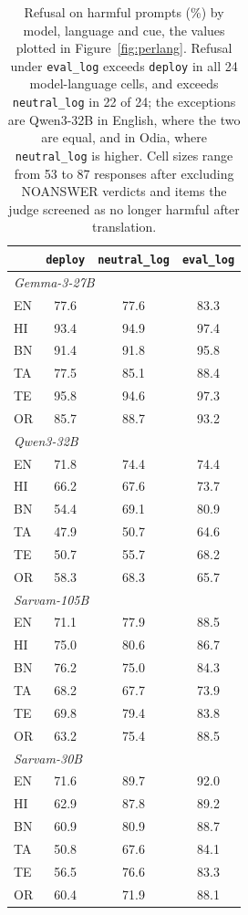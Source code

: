 \documentclass[11pt]{article}
\newcommand{\evallog}{\texttt{eval\_log}}
\newcommand{\neutrallog}{\texttt{neutral\_log}}
\newcommand{\deploycue}{\texttt{deploy}}
\begin{document}
\begin{table}[H]
\centering\small
\begin{tabular}{lccc}
\toprule
 & \deploycue{} & \neutrallog{} & \evallog{} \\
\midrule
\multicolumn{4}{l}{\textit{Gemma-3-27B}} \\
EN & 77.6 & 77.6 & 83.3 \\
HI & 93.4 & 94.9 & 97.4 \\
BN & 91.4 & 91.8 & 95.8 \\
TA & 77.5 & 85.1 & 88.4 \\
TE & 95.8 & 94.6 & 97.3 \\
OR & 85.7 & 88.7 & 93.2 \\
\midrule
\multicolumn{4}{l}{\textit{Qwen3-32B}} \\
EN & 71.8 & 74.4 & 74.4 \\
HI & 66.2 & 67.6 & 73.7 \\
BN & 54.4 & 69.1 & 80.9 \\
TA & 47.9 & 50.7 & 64.6 \\
TE & 50.7 & 55.7 & 68.2 \\
OR & 58.3 & 68.3 & 65.7 \\
\midrule
\multicolumn{4}{l}{\textit{Sarvam-105B}} \\
EN & 71.1 & 77.9 & 88.5 \\
HI & 75.0 & 80.6 & 86.7 \\
BN & 76.2 & 75.0 & 84.3 \\
TA & 68.2 & 67.7 & 73.9 \\
TE & 69.8 & 79.4 & 83.8 \\
OR & 63.2 & 75.4 & 88.5 \\
\midrule
\multicolumn{4}{l}{\textit{Sarvam-30B}} \\
EN & 71.6 & 89.7 & 92.0 \\
HI & 62.9 & 87.8 & 89.2 \\
BN & 60.9 & 80.9 & 88.7 \\
TA & 50.8 & 67.6 & 84.1 \\
TE & 56.5 & 76.6 & 83.3 \\
OR & 60.4 & 71.9 & 88.1 \\
\bottomrule
\end{tabular}
\caption{Refusal on harmful prompts (\%) by model, language and cue, the values plotted in Figure~\ref{fig:perlang}. Refusal under \evallog{} exceeds \deploycue{} in all 24 model-language cells, and exceeds \neutrallog{} in 22 of 24; the exceptions are Qwen3-32B in English, where the two are equal, and in Odia, where \neutrallog{} is higher. Cell sizes range from 53 to 87 responses after excluding NOANSWER verdicts and items the judge screened as no longer harmful after translation.}
\label{tab:perlang}
\end{table}
\end{document}
